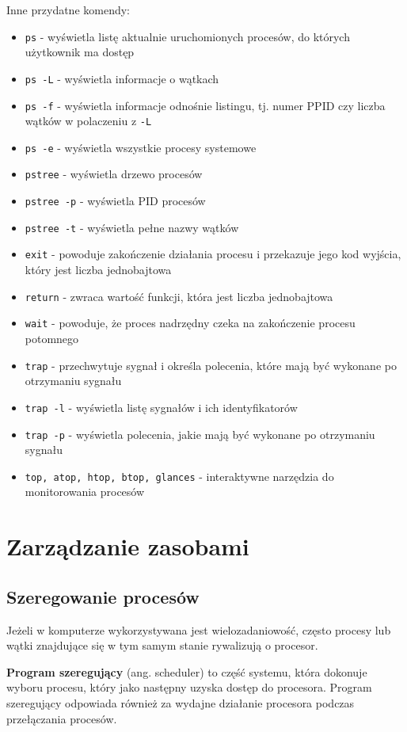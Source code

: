 \documentclass{article}
\begin{document}
Inne przydatne komendy:
\begin{itemize}
    \item \texttt{ps} - wyświetla listę aktualnie uruchomionych procesów, do których użytkownik ma dostęp
    \item \texttt{ps -L} - wyświetla informacje o wątkach
    \item \texttt{ps -f} - wyświetla informacje odnośnie listingu, tj. numer PPID czy liczba wątków w polaczeniu z \texttt{-L}
    \item \texttt{ps -e} - wyświetla wszystkie procesy systemowe
    \item \texttt{pstree} - wyświetla drzewo procesów
    \item \texttt{pstree -p} - wyświetla PID procesów
    \item \texttt{pstree -t} - wyświetla pełne nazwy wątków
    \item \texttt{exit} - powoduje zakończenie działania procesu i przekazuje jego kod wyjścia, który jest liczba jednobajtowa
    \item \texttt{return} - zwraca wartość funkcji, która jest liczba jednobajtowa
    \item \texttt{wait} - powoduje, że proces nadrzędny czeka na zakończenie procesu potomnego
    \item \texttt{trap} - przechwytuje sygnał i określa polecenia, które mają być wykonane po otrzymaniu sygnału
    \item \texttt{trap -l} - wyświetla listę sygnałów i ich identyfikatorów
    \item \texttt{trap -p} - wyświetla polecenia, jakie mają być wykonane po otrzymaniu sygnału
    \item \texttt{top, atop, htop, btop, glances} - interaktywne narzędzia do monitorowania procesów
\end{itemize}

\section{Zarządzanie zasobami}

\subsection{Szeregowanie procesów}
Jeżeli w komputerze wykorzystywana jest wielozadaniowość, często procesy lub wątki znajdujące się w tym samym stanie rywalizują o procesor.

\textbf{Program szeregujący} (ang. scheduler) to część systemu, która dokonuje wyboru procesu, który jako następny uzyska dostęp do procesora. Program szeregujący odpowiada również za wydajne działanie procesora podczas przełączania procesów.
\end{document}
